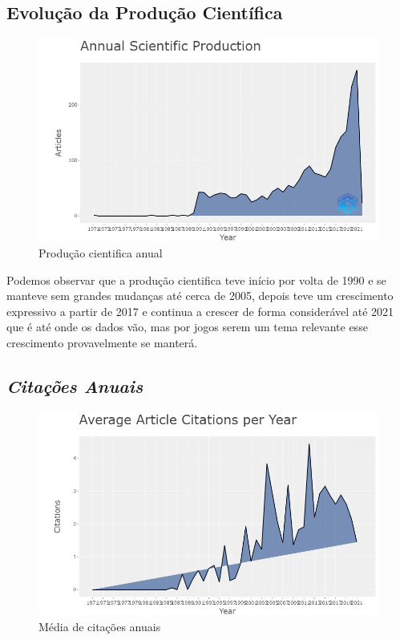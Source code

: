 \subsection{Evolução da Produção Científica}

\begin{figure}[ht]
    \centering
    \includegraphics[width=12cm]{experiments/GMalme/AnaliseBibliometrica/ImpactoDeJogosNaTecnologia/Figs/Annual Scientific Production.png}
    \caption{Produção cientifica anual}
    \label{fig:AIJ_produçãoAnual}
\end{figure}

Podemos observar que a produção cientifica teve início por volta de 1990 e se manteve sem grandes mudanças até cerca de 2005, depois teve um crescimento expressivo a partir de 2017 e continua a crescer de forma considerável até 2021 que é até onde os dados vão, mas por jogos serem um tema relevante esse crescimento provavelmente se manterá.

\subsection{\textit{Citações Anuais}}


\begin{figure}[h]
    \centering
    \includegraphics[width=12cm]{experiments/GMalme/AnaliseBibliometrica/ImpactoDeJogosNaTecnologia/Figs/Average Citations per Year.png}
    \caption{Média de citações anuais}
    \label{fig:AIJ_mediaCitacao}
\end{figure}

